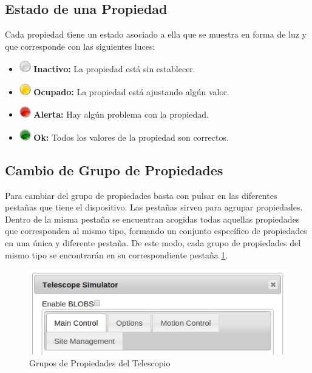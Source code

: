 \subsection{Estado de una Propiedad}
Cada propiedad tiene un estado asociado a ella que se muestra en forma de luz y que corresponde con las siguientes luces:
\begin{itemize}
  \item \includegraphics[width=0.5cm]{./imagenes/grey_light} \textbf{Inactivo:} La propiedad está sin establecer.
  \item \includegraphics[width=0.5cm]{./imagenes/yellow_light} \textbf{Ocupado:} La propiedad está ajustando algún valor.
  \item \includegraphics[width=0.5cm]{./imagenes/red_light} \textbf{Alerta:} Hay algún problema con la propiedad.
  \item \includegraphics[width=0.5cm]{./imagenes/green_light} \textbf{Ok:} Todos los valores de la propiedad son correctos.
\end{itemize}

\subsection{Cambio de Grupo de Propiedades}
Para cambiar del grupo de propiedades basta con pulsar en las diferentes pestañas que tiene el dispositivo. Las pestañas sirven para agrupar propiedades. Dentro de la misma pestaña se encuentran acogidas todas aquellas propiedades que corresponden al mismo tipo, formando un conjunto específico de propiedades en una única y diferente pestaña. De este modo, cada grupo de propiedades del mismo tipo se encontrarán en su correspondiente pestaña \ref{fig:gruposPropiedades}.
\begin{figure}[htb]
\centering
\includegraphics[width=1\textwidth]{./imagenes/capturaGrupos}
\caption{Grupos de Propiedades del Telescopio} \label{fig:gruposPropiedades}
\end{figure}

